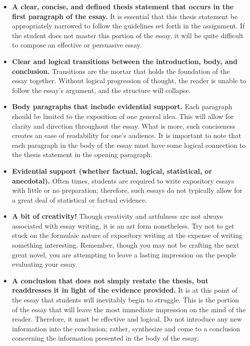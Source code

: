 	\begin{itemize}
		\item \textbf{A clear, concise, and defined thesis statement that occurs in the first paragraph of the essay.}
		It is essential that this thesis statement be appropriately narrowed to follow the guidelines set forth in the assignment. If the student does not master this portion of the essay, it will be quite difficult to compose an effective or persuasive essay.
		
		\item \textbf{Clear and logical transitions between the introduction, body, and conclusion.}
		Transitions are the mortar that holds the foundation of the essay together. Without logical progression of thought, the reader is unable to follow the essay’s argument, and the structure will collapse.
		
		\item \textbf{Body paragraphs that include evidential support.}
		Each paragraph should be limited to the exposition of one general idea. This will allow for clarity and direction throughout the essay. What is more, such conciseness creates an ease of readability for one’s audience. It is important to note that each paragraph in the body of the essay must have some logical connection to the thesis statement in the opening paragraph.
		
		\item \textbf{Evidential support (whether factual, logical, statistical, or anecdotal).}
		Often times, students are required to write expository essays with little or no preparation; therefore, such essays do not typically allow for a great deal of statistical or factual evidence.
		
		\item \textbf{A bit of creativity!}
		Though creativity and artfulness are not always associated with essay writing, it is an art form nonetheless. Try not to get stuck on the formulaic nature of expository writing at the expense of writing something interesting. Remember, though you may not be crafting the next great novel, you are attempting to leave a lasting impression on the people evaluating your essay.
		
		\item \textbf{A conclusion that does not simply restate the thesis, but readdresses it in light of the evidence provided.}
		It is at this point of the essay that students will inevitably begin to struggle. This is the portion of the essay that will leave the most immediate impression on the mind of the reader. Therefore, it must be effective and logical. Do not introduce any new information into the conclusion; rather, synthesize and come to a conclusion concerning the information presented in the body of the essay.
	\end{itemize}


